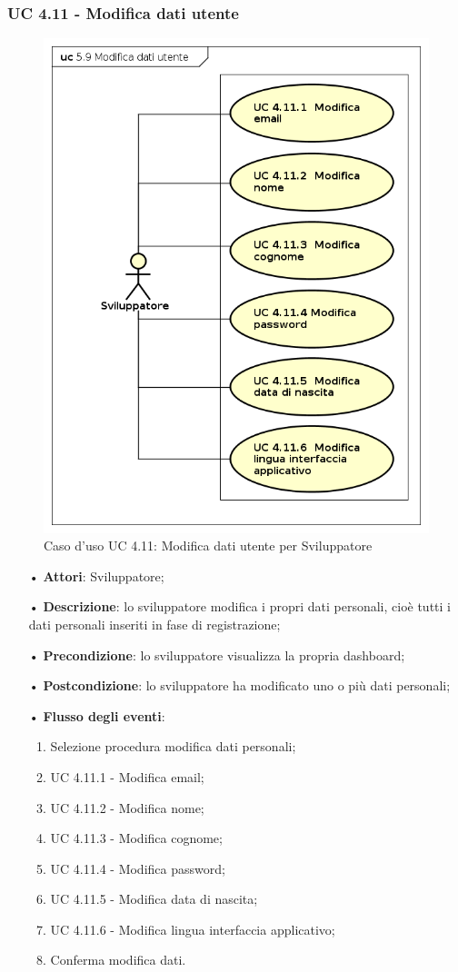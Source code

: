 \subsubsection{UC 4.11 - Modifica dati utente}
\begin{figure}[H]
	\centering
	\includegraphics[width=12cm, keepaspectratio]{img/UC411.png} 
	\caption{Caso d'uso UC 4.11:  Modifica dati utente per Sviluppatore}\label{fig:411}
\end{figure}
\begin{itemize}
	\item[•]\textbf{Attori}: Sviluppatore;
	\item[•]\textbf{Descrizione}: lo sviluppatore modifica i propri dati personali, cioè tutti i dati personali inseriti in fase di registrazione;
	\item[•]\textbf{Precondizione}: lo sviluppatore visualizza la propria dashboard;
	\item[•]\textbf{Postcondizione}: lo sviluppatore ha modificato uno o più dati personali; 
	\item[•]\textbf{Flusso degli eventi}: 
	\begin{enumerate}
		\item Selezione procedura modifica dati personali;
		\item UC 4.11.1 - Modifica email; 
		\item UC 4.11.2 - Modifica nome;
		\item UC 4.11.3 - Modifica cognome;
		\item UC 4.11.4 - Modifica password;
		\item UC 4.11.5 - Modifica data di nascita;
		\item UC 4.11.6 - Modifica lingua interfaccia applicativo;
		\item Conferma modifica dati.
	\end{enumerate}
\end{itemize}
